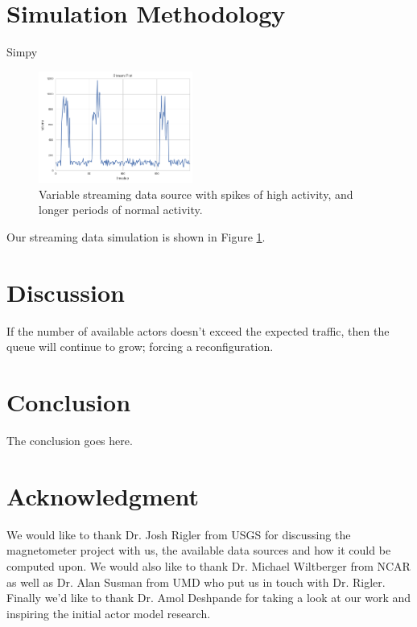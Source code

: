 \documentclass[conference,twocolumn,11pt]{IEEEtran}
\begin{document}
\section{Simulation Methodology}

Simpy \cite{matloff_introduction_2008}

\begin{figure}[!h]
    \centering
    \includegraphics[width=0.45\textwidth]{streaming}
    \caption{Variable streaming data source with spikes of high activity, and longer periods of normal activity.}
    \label{fig:streaming}
\end{figure}

Our streaming data simulation is shown in Figure \ref{fig:streaming}.


\section{Discussion}


If the number of available actors doesn't exceed the expected traffic, then the queue will continue to grow; forcing a reconfiguration.

\section{Conclusion}
The conclusion goes here.






\section*{Acknowledgment}
We would like to thank Dr. Josh Rigler from USGS for discussing the magnetometer project with us, the available data sources and how it could be computed upon. We would also like to thank Dr. Michael Wiltberger from NCAR as well as Dr. Alan Susman from UMD who put us in touch with Dr. Rigler. Finally we'd like to thank Dr. Amol Deshpande for taking a look at our work and inspiring the initial actor model research.






\end{document}
